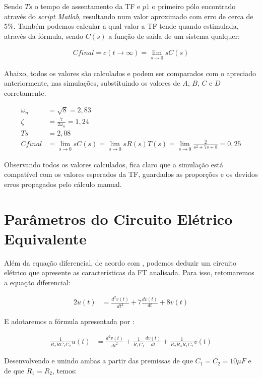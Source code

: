 \documentclass[
	article,			%
	11pt,				%
	oneside,			%
	a4paper,			%
	english,			%
	brazil,				%
	sumario=tradicional
	]{abntex2}
\begin{document}
Sendo ${Ts}$ o tempo de assentamento da TF e ${p1}$ o primeiro pólo encontrado através do \emph{script Matlab}, resultando num valor aproximado com erro de cerca de 5\%. Também podemos calcular a qual valor a TF tende quando estimulada, através da fórmula, sendo ${C(s)}$ a função de saída de um sistema qualquer:

\begin{align*}
  Cfinal = c(t\to\infty) = \lim_{s\to 0} sC(s)
\end{align*}

Abaixo, todos os valores são calculados e podem ser comparados com o apreciado anteriormente, nas simulações, substituindo os valores de ${A}$, ${B}$, ${C}$ e ${D}$ corretamente.

\begin{align*}
  \omega_n &= \sqrt{8} = 2,83 \\
  \zeta &= \frac{7}{2\omega_n} = 1,24 \\
  Ts &= 2,08 \\
  Cfinal &= \lim_{s\to 0} sC(s) = \lim_{s\to 0} sR(s)T(s) = \lim_{s\to 0} \frac{2}{s^2 + 7s + 8} = 0,25
\end{align*}

Observando todos os valores calculados, fica claro que a simulação está compatível com os valores esperados da TF, guardados as proporções e os devidos erros propagados pelo cálculo manual.

\section{Parâmetros do Circuito Elétrico Equivalente}

Além da equação diferencial, de acordo com \cite{controleessencial}, podemos deduzir um circuito elétrico que
apresente as características da FT analisada. Para isso, retomaremos a equação diferencial:

\begin{align*}
  2u(t) &= \frac{d^2 v(t)}{dt^2} + 7\frac{d v(t)}{dt} + 8v(t)
\end{align*}

E adotaremos a fórmula apresentada por \cite{controleessencial}:

\begin{align*}
  \frac{1}{R_2RC_1C_2}u(t) &= \frac{d^2 v(t)}{dt^2} + \frac{1}{R_1C_1}\frac{d v(t)}{dt} + \frac{1}{R_2R_3R_1C_2}v(t)
\end{align*}

Desenvolvendo e unindo ambas a partir das premissas de que ${C_1 = C_2 = 10 \mu F}$ e de que ${R_1 = R_2}$, temos:
\end{document}
